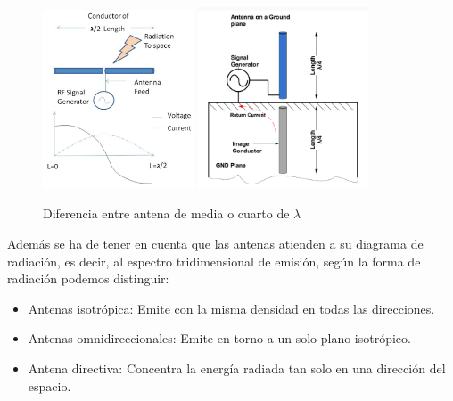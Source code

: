 \documentclass[paper=a4, fontsize=11pt,twoside]{scrartcl}	%
\begin{document}
            \begin{center}
                \begin{figure}[h]
                    \centering
                    \includegraphics[width=0.4\textwidth]{antenna_design.png}
                    \includegraphics[width=0.45\textwidth]{antenna_design_monopole.png}
                    \caption{Diferencia entre antena de media o cuarto de $\lambda$}
                    \label{fig:mesh8}
                \end{figure}
            \end{center}
            Además se ha de tener en cuenta que las antenas atienden a su diagrama de radiación, es decir, al
            espectro tridimensional de emisión, según la forma de radiación podemos distinguir:
            \begin{itemize}
                \item  Antenas isotrópica: Emite con la misma densidad en todas las direcciones.
                \item  Antenas omnidireccionales: Emite en torno a un solo plano isotrópico.
                \item  Antena directiva: Concentra la energía radiada tan solo en una dirección del espacio.
            \end{itemize}
\end{document}
